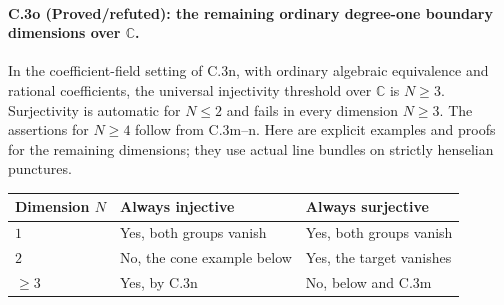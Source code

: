 \paragraph{C.3o (Proved/refuted): the remaining ordinary degree-one boundary dimensions over $\mathbb C$.}
In the coefficient-field setting of C.3n, with ordinary
algebraic equivalence and rational coefficients, the
universal injectivity threshold over $\mathbb C$ is
$N\ge3$. Surjectivity is automatic for $N\le2$ and
fails in every dimension $N\ge3$. The assertions
for $N\ge4$ follow from C.3m--n. Here are explicit
examples and proofs for the remaining dimensions;
they use actual line bundles on strictly henselian
punctures.

\begin{center}
\begin{tabular}{lll}
\toprule
Dimension $N$ & Always injective & Always surjective \\
\midrule
$1$ & Yes, both groups vanish & Yes, both groups vanish \\
$2$ & No, the cone example below & Yes, the target vanishes \\
$\ge3$ & Yes, by C.3n & No, below and C.3m \\
\bottomrule
\end{tabular}
\end{center}

